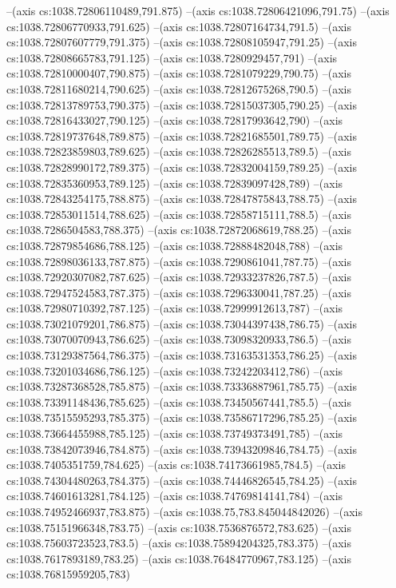 --(axis cs:1038.72806110489,791.875)
--(axis cs:1038.72806421096,791.75)
--(axis cs:1038.72806770933,791.625)
--(axis cs:1038.72807164734,791.5)
--(axis cs:1038.72807607779,791.375)
--(axis cs:1038.72808105947,791.25)
--(axis cs:1038.72808665783,791.125)
--(axis cs:1038.7280929457,791)
--(axis cs:1038.72810000407,790.875)
--(axis cs:1038.7281079229,790.75)
--(axis cs:1038.72811680214,790.625)
--(axis cs:1038.72812675268,790.5)
--(axis cs:1038.72813789753,790.375)
--(axis cs:1038.72815037305,790.25)
--(axis cs:1038.72816433027,790.125)
--(axis cs:1038.72817993642,790)
--(axis cs:1038.72819737648,789.875)
--(axis cs:1038.72821685501,789.75)
--(axis cs:1038.72823859803,789.625)
--(axis cs:1038.72826285513,789.5)
--(axis cs:1038.72828990172,789.375)
--(axis cs:1038.72832004159,789.25)
--(axis cs:1038.72835360953,789.125)
--(axis cs:1038.72839097428,789)
--(axis cs:1038.72843254175,788.875)
--(axis cs:1038.72847875843,788.75)
--(axis cs:1038.72853011514,788.625)
--(axis cs:1038.72858715111,788.5)
--(axis cs:1038.7286504583,788.375)
--(axis cs:1038.72872068619,788.25)
--(axis cs:1038.72879854686,788.125)
--(axis cs:1038.72888482048,788)
--(axis cs:1038.72898036133,787.875)
--(axis cs:1038.7290861041,787.75)
--(axis cs:1038.72920307082,787.625)
--(axis cs:1038.72933237826,787.5)
--(axis cs:1038.72947524583,787.375)
--(axis cs:1038.7296330041,787.25)
--(axis cs:1038.72980710392,787.125)
--(axis cs:1038.72999912613,787)
--(axis cs:1038.73021079201,786.875)
--(axis cs:1038.73044397438,786.75)
--(axis cs:1038.73070070943,786.625)
--(axis cs:1038.73098320933,786.5)
--(axis cs:1038.73129387564,786.375)
--(axis cs:1038.73163531353,786.25)
--(axis cs:1038.73201034686,786.125)
--(axis cs:1038.73242203412,786)
--(axis cs:1038.73287368528,785.875)
--(axis cs:1038.73336887961,785.75)
--(axis cs:1038.73391148436,785.625)
--(axis cs:1038.73450567441,785.5)
--(axis cs:1038.73515595293,785.375)
--(axis cs:1038.73586717296,785.25)
--(axis cs:1038.73664455988,785.125)
--(axis cs:1038.73749373491,785)
--(axis cs:1038.73842073946,784.875)
--(axis cs:1038.73943209846,784.75)
--(axis cs:1038.7405351759,784.625)
--(axis cs:1038.74173661985,784.5)
--(axis cs:1038.74304480263,784.375)
--(axis cs:1038.74446826545,784.25)
--(axis cs:1038.74601613281,784.125)
--(axis cs:1038.74769814141,784)
--(axis cs:1038.74952466937,783.875)
--(axis cs:1038.75,783.845044842026)
--(axis cs:1038.75151966348,783.75)
--(axis cs:1038.7536876572,783.625)
--(axis cs:1038.75603723523,783.5)
--(axis cs:1038.75894204325,783.375)
--(axis cs:1038.7617893189,783.25)
--(axis cs:1038.76484770967,783.125)
--(axis cs:1038.76815959205,783)
